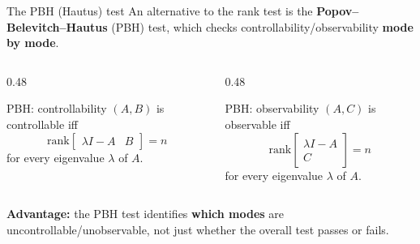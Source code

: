\documentclass[aspectratio=169,10pt]{beamer}
\begin{document}
\begin{frame}{The PBH (Hautus) test}
An alternative to the rank test is the \textbf{Popov--Belevitch--Hautus}
(PBH) test, which checks controllability/observability \textbf{mode by mode}.

\begin{columns}[T,totalwidth=\textwidth]
\begin{column}{0.48\textwidth}
\begin{defnbox}{PBH: controllability}
$(A,B)$ is controllable iff
\[
\mathrm{rank}\!\begin{bmatrix}\lambda I - A & B\end{bmatrix}=n
\]
for every eigenvalue $\lambda$ of $A$.
\end{defnbox}
\end{column}
\begin{column}{0.48\textwidth}
\begin{defnbox}{PBH: observability}
$(A,C)$ is observable iff
\[
\mathrm{rank}\!\begin{bmatrix}\lambda I - A \\ C\end{bmatrix}=n
\]
for every eigenvalue $\lambda$ of $A$.
\end{defnbox}
\end{column}
\end{columns}

\vspace{0.3em}
\textbf{Advantage:} the PBH test identifies \textbf{which modes} are
uncontrollable/unobservable, not just whether the overall test passes or
fails.
\end{frame}
\end{document}
